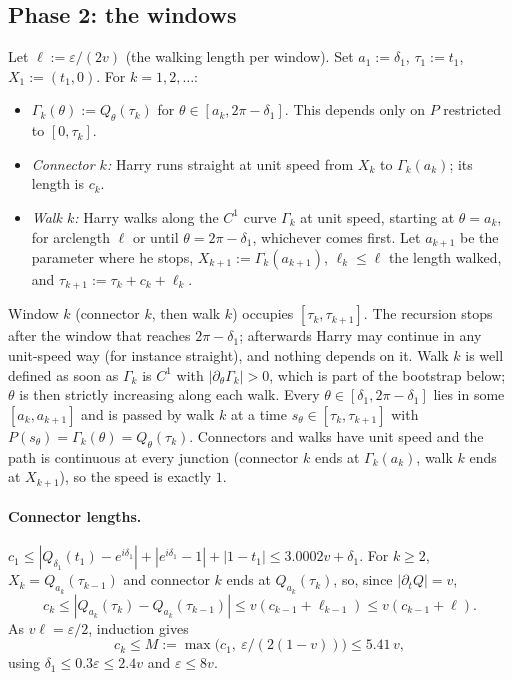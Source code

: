 \subsection{Phase 2: the windows}\label{sec:D1-windows}
Let $\ell:=\varepsilon/(2v)$ (the walking length per window). Set $a_1:=\delta_1$, $\tau_1:=t_1$, $X_1:=(t_1,0)$. For
$k=1,2,\dots$:
\begin{itemize}
\item $\Gamma_k(\theta):=Q_\theta(\tau_k)$ for $\theta\in[a_k,2\pi-\delta_1]$. This depends only on $P$ restricted to $[0,\tau_k]$.
\item \emph{Connector $k$:} Harry runs straight at unit speed from $X_k$ to $\Gamma_k(a_k)$; its length is $c_k$.
\item \emph{Walk $k$:} Harry walks along the $C^1$ curve $\Gamma_k$ at unit speed, starting at $\theta=a_k$, for arclength $\ell$
or until $\theta=2\pi-\delta_1$, whichever comes first. Let $a_{k+1}$ be the parameter where he stops,
$X_{k+1}:=\Gamma_k(a_{k+1})$, $\ell_k\le\ell$ the length walked, and $\tau_{k+1}:=\tau_k+c_k+\ell_k$.
\end{itemize}
Window $k$ (connector $k$, then walk $k$) occupies $[\tau_k,\tau_{k+1}]$. The recursion stops after the window that reaches
$2\pi-\delta_1$; afterwards Harry may continue in any unit-speed way (for instance straight), and nothing depends on it.
Walk $k$ is well defined as soon as $\Gamma_k$ is $C^1$ with $|\partial_\theta\Gamma_k|>0$, which is part of the bootstrap
below; $\theta$ is then strictly increasing along each walk. Every $\theta\in[\delta_1,2\pi-\delta_1]$ lies in some
$[a_k,a_{k+1}]$ and is passed by walk $k$ at a time $s_\theta\in[\tau_k,\tau_{k+1}]$ with
$P(s_\theta)=\Gamma_k(\theta)=Q_\theta(\tau_k)$. Connectors and walks have unit speed and the path is continuous at every
junction (connector $k$ ends at $\Gamma_k(a_k)$, walk $k$ ends at $X_{k+1}$), so the speed is exactly $1$.

\paragraph{Connector lengths.}
$c_1\le|Q_{\delta_1}(t_1)-e^{i\delta_1}|+|e^{i\delta_1}-1|+|1-t_1|\le3.0002v+\delta_1$. For $k\ge2$,
$X_k=Q_{a_k}(\tau_{k-1})$ and connector $k$ ends at $Q_{a_k}(\tau_k)$, so, since $|\partial_tQ|=v$,
\begin{equation}\label{eq:D-crec}
c_k\le|Q_{a_k}(\tau_k)-Q_{a_k}(\tau_{k-1})|\le v(c_{k-1}+\ell_{k-1})\le v(c_{k-1}+\ell).
\end{equation}
As $v\ell=\varepsilon/2$, induction gives
\begin{equation}\label{eq:D-M}
c_k\le M:=\max\bigl(c_1,\ \varepsilon/(2(1-v))\bigr)\le5.41\,v,
\end{equation}
using $\delta_1\le0.3\varepsilon\le2.4v$ and $\varepsilon\le8v$.

